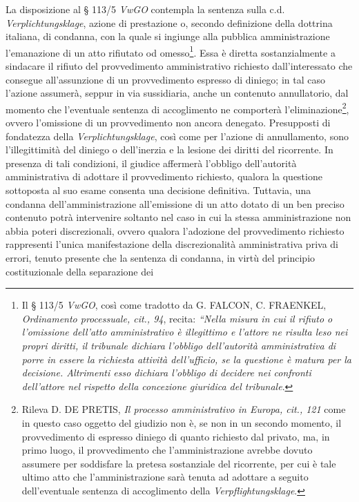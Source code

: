 \documentclass[12pt,it,a4paper,]{report}
\begin{document}
La disposizione al § 113/5 \emph{VwGO} contempla la sentenza sulla c.d.
\emph{Verplichtungsklage}, azione di prestazione o, secondo definizione
della dottrina italiana, di condanna, con la quale si ingiunge alla
pubblica amministrazione l'emanazione di un atto rifiutato od
omesso\footnote{Il § 113/5 \emph{VwGO}, così come tradotto da G. FALCON,
  C. FRAENKEL, \emph{Ordinamento processuale, cit., 94}, recita:
  \emph{``Nella misura in cui il rifiuto o l'omissione dell'atto
  amministrativo è illegittimo e l'attore ne risulta leso nei propri
  diritti, il tribunale dichiara l'obbligo dell'autorità amministrativa
  di porre in essere la richiesta attività dell'ufficio, se la questione
  è matura per la decisione. Altrimenti esso dichiara l'obbligo di
  decidere nei confronti dell'attore nel rispetto della concezione
  giuridica del tribunale}.}. Essa è diretta sostanzialmente a sindacare
il rifiuto del provvedimento amministrativo richiesto dall'interessato
che consegue all'assunzione di un provvedimento espresso di diniego; in
tal caso l'azione assumerà, seppur in via sussidiaria, anche un
contenuto annullatorio, dal momento che l'eventuale sentenza di
accoglimento ne comporterà l'eliminazione\footnote{Rileva D. DE PRETIS,
  \emph{Il processo amministrativo in Europa, cit., 121} come in questo
  caso oggetto del giudizio non è, se non in un secondo momento, il
  provvedimento di espresso diniego di quanto richiesto dal privato, ma,
  in primo luogo, il provvedimento che l'amministrazione avrebbe dovuto
  assumere per soddisfare la pretesa sostanziale del ricorrente, per cui
  è tale ultimo atto che l'amministrazione sarà tenuta ad adottare a
  seguito dell'eventuale sentenza di accoglimento della
  \emph{Verpflightungsklage}.}, ovvero l'omissione di un provvedimento
non ancora denegato. Presupposti di fondatezza della
\emph{Verplichtungsklage}, così come per l'azione di annullamento, sono
l'illegittimità del diniego o dell'inerzia e la lesione dei diritti del
ricorrente. In presenza di tali condizioni, il giudice affermerà
l'obbligo dell'autorità amministrativa di adottare il provvedimento
richiesto, qualora la questione sottoposta al suo esame consenta una
decisione definitiva. Tuttavia, una condanna dell'amministrazione
all'emissione di un atto dotato di un ben preciso contenuto potrà
intervenire soltanto nel caso in cui la stessa amministrazione non abbia
poteri discrezionali, ovvero qualora l'adozione del provvedimento
richiesto rappresenti l'unica manifestazione della discrezionalità
amministrativa priva di errori, tenuto presente che la sentenza di
condanna, in virtù del principio costituzionale della separazione dei
\end{document}
